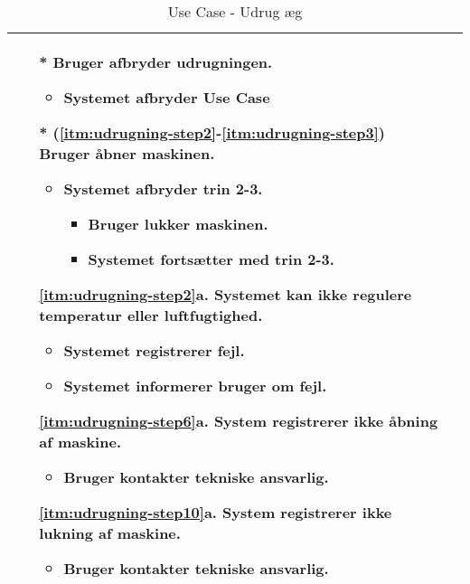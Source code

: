 \begin{table}[H]
\begin{tabular}[\textwidth]{|p{}|p{}|}
\begin{enumerate}
		\item[*] Bruger afbryder udrugningen.
		\begin{itemize}
			\item Systemet afbryder Use Case \usecaseref{Udrug aeg}
		\end{itemize}
	\end{enumerate}

	\begin{enumerate}
		\item[*](\ref{itm:udrugning-step2}-\ref{itm:udrugning-step3}) Bruger åbner maskinen.
		\begin{itemize}
			\item Systemet afbryder trin 2-3.
			\begin{itemize}
				\item Bruger lukker maskinen.
				\item Systemet fortsætter med trin 2-3.
			\end{itemize}
		\end{itemize}
	\end{enumerate}

	\begin{enumerate}
	\item[\ref{itm:udrugning-step2}a.] Systemet kan ikke regulere temperatur eller luftfugtighed.
	\begin{itemize}
	\item Systemet registrerer fejl.
	\item Systemet informerer bruger om fejl.
	\end{itemize}
	\end{enumerate} 
	
	
	\begin{enumerate}
	\item[\ref{itm:udrugning-step6}a.]  System registrerer ikke åbning af maskine.
	\begin{itemize}
	\item Bruger kontakter tekniske ansvarlig.
	\end{itemize}
	\end{enumerate}  
	
	\begin{enumerate}
	\item[\ref{itm:udrugning-step10}a.]  System registrerer ikke lukning af maskine.
	\begin{itemize}
	\item Bruger kontakter tekniske ansvarlig.
	\end{itemize}
	\end{enumerate} \\ \hline 
\end{tabular}
\caption{Use Case - Udrug æg}
\label{tab:usecase-Udrug-aeg}
\end{table}